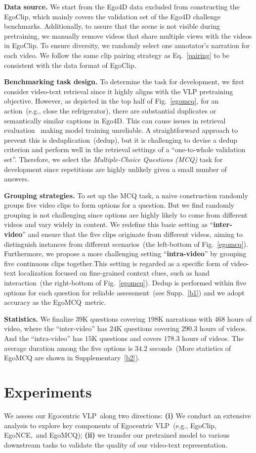 \documentclass{article}
\newcommand{\vlp}{Egocentric VLP}
\newcommand{\dataset}{EgoClip}
\newcommand{\model}{EgoNCE\xspace}
\newcommand{\eval}{EgoMCQ}
\begin{document}
\textbf{Data source.}
We start from the Ego4D data excluded from constructing the \dataset, which mainly covers the validation set of the Ego4D challenge benchmarks.
Additionally, to assure that the scene is not visible during pretraining, we manually remove videos that share multiple views with the videos in \dataset.
To ensure diversity, we randomly select one annotator's narration for each video.
We follow the same clip pairing strategy as Eq.~\ref{pairing} to be consistent with the data format of \dataset.

\textbf{Benchmarking task design.}
To determine the task for development, we first consider video-text retrieval since it highly aligns with the VLP pretraining objective. 
However, as depicted in the top half of Fig.~\ref{egomcq}, for an action~(e.g., close the refrigerator), there are substantial duplicates or semantically similar captions in Ego4D. This can cause issues in retrieval evaluation~\cite{wray2021semantic} making model training unreliable.
A straightforward approach to prevent this is deduplication~(dedup), but it is challenging to devise a dedup criterion and perform well in the retrieval settings of a ``one-to-whole validation set''.
Therefore, we select the \textit{Multiple-Choice Questions (MCQ)} task for development since repetitions are highly unlikely given a small number of answers.

\textbf{Grouping strategies.}
To set up the MCQ task, a naive construction randomly groups five video clips to form options for a question. But we find randomly grouping is not challenging since options are highly likely to come from different videos and vary widely in content.
We redefine this basic setting as ``\textbf{inter-video}'' and ensure that the five clips originate from different videos, aiming to distinguish instances from different scenarios~(the left-bottom of Fig.~\ref{egomcq}).
Furthermore, we propose a more challenging setting ``\textbf{intra-video}'' by grouping five continuous clips together.This setting is regarded as a specific form of video-text localization focused on fine-grained context clues, such as hand interaction~(the right-bottom of Fig.~\ref{egomcq}).
Dedup is performed within five options for each question for reliable assessment~(see Supp.~\ref{b1}) and we adopt accuracy as the \eval~metric.

\textbf{Statistics.}
We finalize $39$K questions covering $198$K narrations with $468$ hours of video, where the ``inter-video'' has $24$K questions covering $290.3$ hours of videos. And the ``intra-video'' has $15$K questions and covers $178.3$ hours of videos. The average duration among the five options is $34.2$ seconds~(More statistics of EgoMCQ are shown in Supplementary~\ref{b2}). \section{Experiments}
We assess our \vlp~along two directions:
\textbf{(i)} We conduct an extensive analysis to explore key components of \vlp~(e.g., \dataset, \model,~and \eval);
\textbf{(ii)} we transfer our pretrained model to various downstream tasks to validate the quality of our video-text representation.
\end{document}
